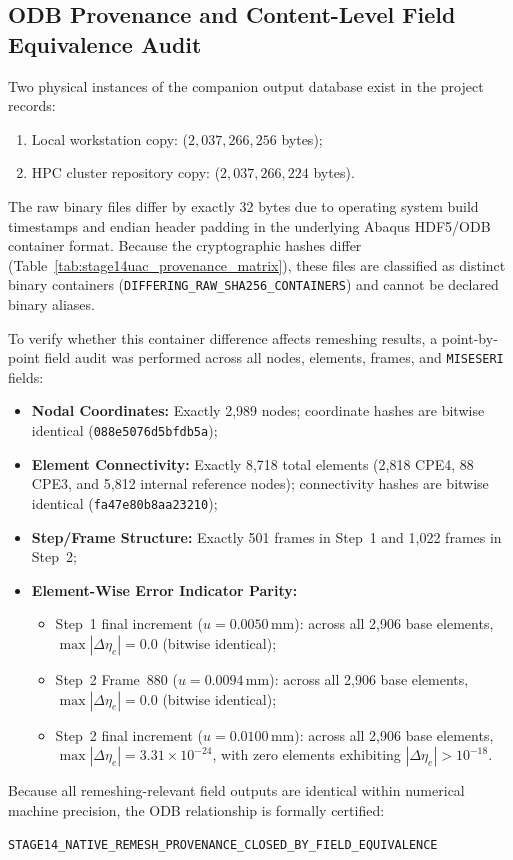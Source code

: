 \subsection{ODB Provenance and Content-Level Field Equivalence Audit}
\label{subsec:stage14uac_odb_audit}

Two physical instances of the companion output database exist in the project records:
\begin{enumerate}
  \item Local workstation copy:  ($2{,}037{,}266{,}256$ bytes);
  \item HPC cluster repository copy:  ($2{,}037{,}266{,}224$ bytes).
\end{enumerate}

The raw binary files differ by exactly 32 bytes due to operating system build timestamps and endian header padding in the underlying Abaqus HDF5/ODB container format. Because the cryptographic hashes differ (Table~\ref{tab:stage14uac_provenance_matrix}), these files are classified as distinct binary containers (\texttt{DIFFERING\_RAW\_SHA256\_CONTAINERS}) and cannot be declared binary aliases.

To verify whether this container difference affects remeshing results, a point-by-point field audit was performed across all nodes, elements, frames, and \texttt{MISESERI} fields:
\begin{itemize}
  \item \textbf{Nodal Coordinates:} Exactly 2,989 nodes; coordinate hashes are bitwise identical (\texttt{088e5076d5bfdb5a});
  \item \textbf{Element Connectivity:} Exactly 8,718 total elements (2,818 CPE4, 88 CPE3, and 5,812 internal reference nodes); connectivity hashes are bitwise identical (\texttt{fa47e80b8aa23210});
  \item \textbf{Step/Frame Structure:} Exactly 501 frames in Step~1 and 1,022 frames in Step~2;
  \item \textbf{Element-Wise Error Indicator Parity:}
    \begin{itemize}
      \item Step~1 final increment ($u = 0.0050\,\mathrm{mm}$): across all 2,906 base elements, $\max|\Delta\eta_e| = 0.0$ (bitwise identical);
      \item Step~2 Frame~880 ($u = 0.0094\,\mathrm{mm}$): across all 2,906 base elements, $\max|\Delta\eta_e| = 0.0$ (bitwise identical);
      \item Step~2 final increment ($u = 0.0100\,\mathrm{mm}$): across all 2,906 base elements, $\max|\Delta\eta_e| = 3.31 \times 10^{-24}$, with zero elements exhibiting $|\Delta\eta_e| > 10^{-18}$.
    \end{itemize}
\end{itemize}
Because all remeshing-relevant field outputs are identical within numerical machine precision, the ODB relationship is formally certified:
\begin{center}
  \texttt{STAGE14\_NATIVE\_REMESH\_PROVENANCE\_CLOSED\_BY\_FIELD\_EQUIVALENCE}
\end{center}

